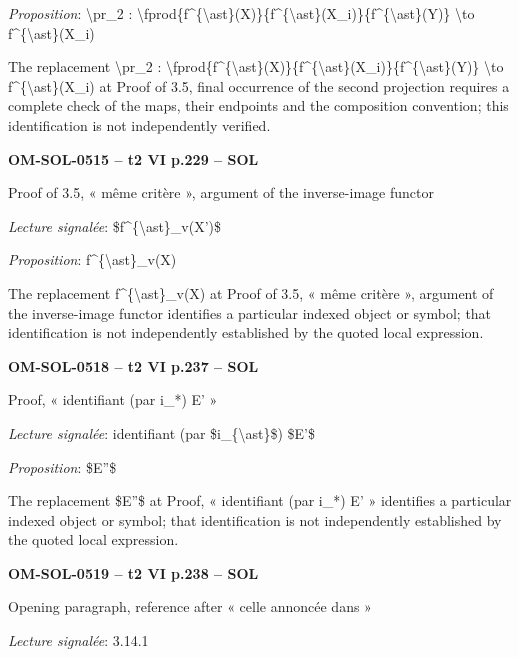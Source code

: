 \emph{Proposition}: \textbackslash{}pr\_2 : \textbackslash{}fprod\{f\textasciicircum{}\{\textbackslash{}ast\}(X)\}\{f\textasciicircum{}\{\textbackslash{}ast\}(X\_i)\}\{f\textasciicircum{}\{\textbackslash{}ast\}(Y)\} \textbackslash{}to f\textasciicircum{}\{\textbackslash{}ast\}(X\_i)\par
The replacement \textbackslash{}pr\_2 : \textbackslash{}fprod\{f\textasciicircum{}\{\textbackslash{}ast\}(X)\}\{f\textasciicircum{}\{\textbackslash{}ast\}(X\_i)\}\{f\textasciicircum{}\{\textbackslash{}ast\}(Y)\} \textbackslash{}to f\textasciicircum{}\{\textbackslash{}ast\}(X\_i) at Proof of 3.5, final occurrence of the second projection requires a complete check of the maps, their endpoints and the composition convention; this identification is not independently verified.\par
\par\noindent\textbf{OM-SOL-0515 -- t2 VI p.229 -- SOL}\par
Proof of 3.5, « même critère », argument of the inverse-image functor\par
\emph{Lecture signalée}: \$f\textasciicircum{}\{\textbackslash{}ast\}\_v(X')\$\par
\emph{Proposition}: f\textasciicircum{}\{\textbackslash{}ast\}\_v(X)\par
The replacement f\textasciicircum{}\{\textbackslash{}ast\}\_v(X) at Proof of 3.5, « même critère », argument of the inverse-image functor identifies a particular indexed object or symbol; that identification is not independently established by the quoted local expression.\par
\par\noindent\textbf{OM-SOL-0518 -- t2 VI p.237 -- SOL}\par
Proof, « identifiant (par i\_*) E' »\par
\emph{Lecture signalée}: identifiant (par \$i\_\{\textbackslash{}ast\}\$) \$E'\$\par
\emph{Proposition}: \$E''\$\par
The replacement \$E''\$ at Proof, « identifiant (par i\_*) E' » identifies a particular indexed object or symbol; that identification is not independently established by the quoted local expression.\par
\par\noindent\textbf{OM-SOL-0519 -- t2 VI p.238 -- SOL}\par
Opening paragraph, reference after « celle annoncée dans »\par
\emph{Lecture signalée}: 3.14.1\par
